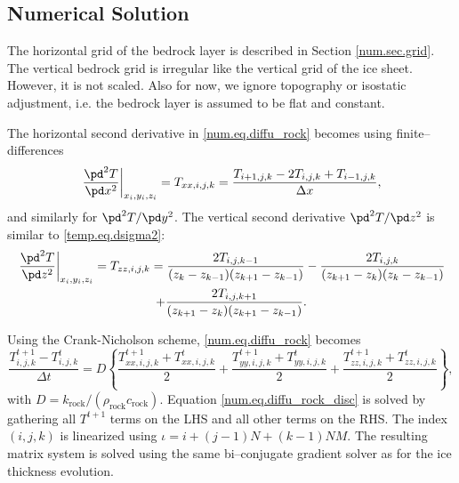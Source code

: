 \subsection{Numerical Solution}
The horizontal grid of the bedrock layer is described in Section \ref{num.sec.grid}. The vertical bedrock grid is irregular like the vertical grid of the ice sheet. However, it is not scaled. Also for now, we ignore topography or isostatic adjustment, i.e. the bedrock layer is assumed to be flat and constant.

The horizontal second derivative in \eqref{num.eq.diffu_rock} becomes using finite--differences
\begin{equation}
  \left.\frac{\pd^2T}{\pd x^2}\right|_{x_i,y_i,z_i} = T_{xx,i,j,k} = \frac{T_{i+1,j,k}-2T_{i,j,k}+T_{i-1,j,k}}{\Delta x},
\end{equation}
and similarly for $\pd^2T/\pd y^2$. The vertical second derivative $\pd^2T/\pd z^2$ is similar to \eqref{temp.eq.dsigma2}:
\begin{multline}
  \left.\frac{\pd^2 T}{\pd z^2}\right|_{x_i,y_i,z_i} = T_{zz,i,j,k} = \frac{2T_{i,j,k-1}}{(z_k-z_{k-1})(z_{k+1}-z_{k-1})} - \frac{2T_{i,j,k}}{(z_{k+1}-z_k)(z_k-z_{k-1})}\\
  + \frac{2T_{i,j,k+1}}{(z_{k+1}-z_k)(z_{k+1}-z_{k-1})}.
\end{multline}

\noindent
Using the Crank-Nicholson scheme, \eqref{num.eq.diffu_rock} becomes
\begin{equation}
  \label{num.eq.diffu_rock_disc}
  \frac{T_{i,j,k}^{t+1}-T_{i,j,k}^{t}}{\Delta t}=D\left\{\frac{T_{xx,i,j,k}^{t+1}+T_{xx,i,j,k}^{t}}2 + \frac{T_{yy,i,j,k}^{t+1}+T_{yy,i,j,k}^{t}}2 + \frac{T_{zz,i,j,k}^{t+1}+T_{zz,i,j,k}^{t}}2 \right\},
\end{equation}
with $D=k_{\text{rock}}/(\rho_{\text{rock}}c_{\text{rock}})$. Equation \eqref{num.eq.diffu_rock_disc} is solved by gathering all $T^{t+1}$ terms on the LHS and all other terms on the RHS. The index $(i,j,k)$ is linearized using $\iota = i+(j-1)N+(k-1)NM$. The resulting matrix system is solved using the same bi--conjugate gradient solver as for the ice thickness evolution.

